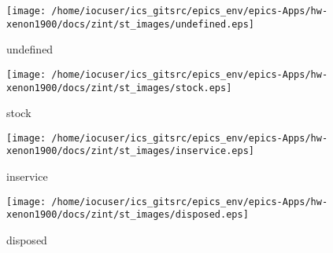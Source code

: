 \noindent
\vspace{1.4cm}
\begin{minipage}{.2\textwidth}
\begin{center}
\texttt{[image: /home/iocuser/ics\_gitsrc/epics\_env/epics-Apps/hw-xenon1900/docs/zint/st\_images/undefined.eps]}
\end{center}
\end{minipage}
\begin{minipage}{.7\textwidth}
undefined
\end{minipage}


\noindent
\vspace{1.4cm}
\begin{minipage}{.2\textwidth}
\begin{center}
\texttt{[image: /home/iocuser/ics\_gitsrc/epics\_env/epics-Apps/hw-xenon1900/docs/zint/st\_images/stock.eps]}
\end{center}
\end{minipage}
\begin{minipage}{.7\textwidth}
stock
\end{minipage}


\noindent
\vspace{1.4cm}
\begin{minipage}{.2\textwidth}
\begin{center}
\texttt{[image: /home/iocuser/ics\_gitsrc/epics\_env/epics-Apps/hw-xenon1900/docs/zint/st\_images/inservice.eps]}
\end{center}
\end{minipage}
\begin{minipage}{.7\textwidth}
inservice
\end{minipage}


\noindent
\vspace{1.4cm}
\begin{minipage}{.2\textwidth}
\begin{center}
\texttt{[image: /home/iocuser/ics\_gitsrc/epics\_env/epics-Apps/hw-xenon1900/docs/zint/st\_images/disposed.eps]}
\end{center}
\end{minipage}
\begin{minipage}{.7\textwidth}
disposed
\end{minipage}


